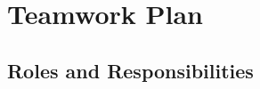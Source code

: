 \section{Teamwork Plan}
\label{sec:teamwork-plan}
\subsection{Roles and Responsibilities}
\label{subsec:roles-and-responsibilities}

\vspace{1em}

\centering
\small
